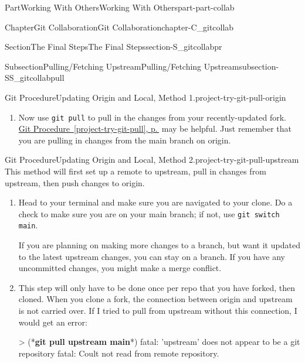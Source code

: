 \documentclass[twoside,10pt,]{book}
\newcommand{\xreffont}{\relax}
\newcommand{\mono}[1]{\texttt{#1}}
\newcommand{\consoleinput}[1]{\textbf{#1}}
\begin{document}
\begin{partptx}{Part}{Working With Others}{}{Working With Others}{}{}{part-part-collab}
\begin{chapterptx}{Chapter}{Git Collaboration}{}{Git Collaboration}{}{}{chapter-C_gitcollab}
\begin{sectionptx}{Section}{The Final Steps}{}{The Final Steps}{}{}{section-S_gitcollabpr}
\begin{subsectionptx}{Subsection}{Pulling\slash{}Fetching Upstream}{}{Pulling\slash{}Fetching Upstream}{}{}{subsection-SS_gitcollabpull}
\begin{project}{Git Procedure}{Updating Origin and Local, Method 1.}{project-try-git-pull-origin}
\begin{enumerate}[font=\bfseries,label=(\alph*),ref=\alph*]
\item{}Now use \mono{git pull} to pull in the changes from your recently-updated fork. \hyperref[project-try-git-pull]{Git Procedure~{\xreffont\ref{project-try-git-pull}}, p.\,\pageref{project-try-git-pull}} may be helpful. Just remember that you are pulling in changes from the main branch on origin.%
\end{enumerate}%
\end{project}%
\begin{project}{Git Procedure}{Updating Origin and Local, Method 2.}{project-try-git-pull-upstream}%
%
%
%
%
%
%
%
%
This method will first set up a remote to upstream, pull in changes from upstream, then push changes to origin.%
\begin{enumerate}[font=\bfseries,label=(\alph*),ref=\alph*]%
\item{}Head to your terminal and make sure you are navigated to your clone. Do a check to make sure you are on your main branch; if not, use \mono{git switch main}.%
\par
If you are planning on making more changes to a branch, but want it updated to the latest upstream changes, you can stay on a branch. If you have any uncommitted changes, you might make a merge conflict.%
\item{}This step will only have to be done once per repo that you have forked, then cloned. When you clone a fork, the connection between origin and upstream is not carried over. If I tried to pull from upstream without this connection, I would get an error:%
\begin{console}{0}{1}{0}
> (*\consoleinput{git pull upstream main}*)
fatal: 'upstream' does not appear to be a git repository
fatal: Coult not read from remote repository.


\end{console}
\end{enumerate}
\end{project}
\end{subsectionptx}
\end{sectionptx}
\end{chapterptx}
\end{partptx}
\end{document}
